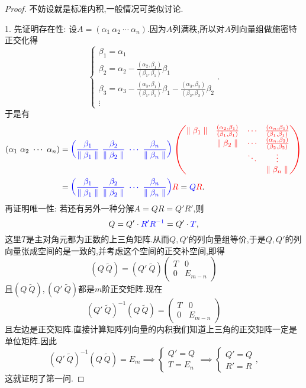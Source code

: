 \documentclass[../../main.tex]{subfiles}
\begin{document}
\begin{proof}
不妨设就是标准内积,一般情况可类似讨论.

1. 先证明存在性: 设\( A = (\alpha_1\ \alpha_2\ \cdots\ \alpha_n) \).因为\( A \)列满秩,所以对\( A \)列向量组做施密特正交化得
\[
\begin{cases}
\beta_1 = \alpha_1 \\
\beta_2 = \alpha_2 - \frac{(\alpha_2, \beta_1)}{(\beta_1, \beta_1)} \beta_1 \\
\beta_3 = \alpha_3 - \frac{(\alpha_3, \beta_1)}{(\beta_1, \beta_1)} \beta_1 - \frac{(\alpha_3, \beta_2)}{(\beta_2, \beta_2)} \beta_2 \\
\vdots
\end{cases}.
\]
于是有
\begin{align*}
(\alpha _1\,\,\alpha _2\,\,\cdots \,\,\alpha _n)&={\color{blue} \left( \frac{\beta _1}{\parallel \beta _1\parallel}\,\,\frac{\beta _2}{\parallel \beta _2\parallel}\,\,\cdots \,\,\frac{\beta _n}{\parallel \beta _n\parallel} \right) {\color{red} \left( \begin{matrix}
\parallel \beta _1\parallel&		\frac{\left( \alpha _2,\beta _1 \right)}{\left( \beta _1,\beta _1 \right)}&		\cdots&		\frac{\left( \alpha _n,\beta _1 \right)}{\left( \beta _1,\beta _1 \right)}\\
&		\parallel \beta _2\parallel&		\cdots&		\frac{\left( \alpha _n,\beta _2 \right)}{\left( \beta _2,\beta _2 \right)}\\
&		&		\ddots&		\vdots\\
&		&		&		\parallel \beta _n\parallel\\
\end{matrix} \right)}}
\\
&={\color{blue} \left( \frac{\beta _1}{\parallel \beta _1\parallel}\,\,\frac{\beta _2}{\parallel \beta _2\parallel}\,\,\cdots \,\,\frac{\beta _n}{\parallel \beta _n\parallel} \right) }{\color{red} R}={\color{blue} Q}{\color{red} R}.
\end{align*}
再证明唯一性: 若还有另外一种分解\( A = QR = Q' R' \),则
\[
Q = Q' \cdot {\color{blue} R' R^{-1}} = Q' \cdot {\color{blue} T},
\]
这里\( T \)是主对角元都为正数的上三角矩阵.从而\( Q, Q' \)的列向量组等价,于是\( Q, Q' \)的列向量张成空间的是一致的,并考虑这个空间的正交补空间,即得
\[
(Q\ \widetilde{Q}) = (Q'\ \widetilde{Q}) \begin{pmatrix} T & 0 \\ 0 & E_{m - n} \end{pmatrix}
\]
且\( (Q\ \widetilde{Q}), (Q'\ \widetilde{Q}) \)都是\( m \)阶正交矩阵.现在
\[
(Q'\ \widetilde{Q})^{-1} (Q\ \widetilde{Q}) = \begin{pmatrix} T & 0 \\ 0 & E_{m - n} \end{pmatrix}
\]
且左边是正交矩阵.直接计算矩阵列向量的内积我们知道上三角的正交矩阵一定是单位矩阵.因此
\[
(Q'\ \widetilde{Q})^{-1} (Q\ \widetilde{Q}) = E_m \implies \begin{cases} Q' = Q \\ T = E_n \end{cases} \implies \begin{cases} Q' = Q \\ R' = R \end{cases},
\]
这就证明了第一问.


\end{proof}
\end{document}
